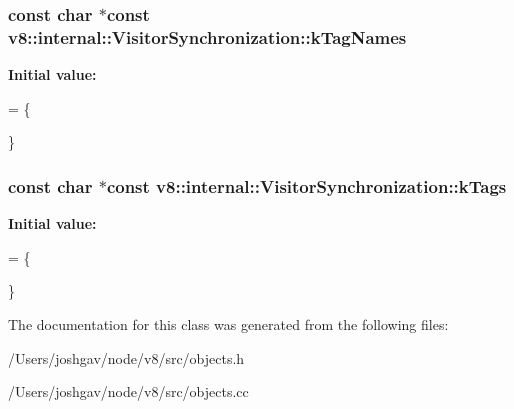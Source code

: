 \subsubsection[{\texorpdfstring{k\+Tag\+Names}{kTagNames}}]{\setlength{\rightskip}{0pt plus 5cm}const char $\ast$const v8\+::internal\+::\+Visitor\+Synchronization\+::k\+Tag\+Names\hspace{0.3cm}{\ttfamily [static]}}\hypertarget{classv8_1_1internal_1_1_visitor_synchronization_a3869a214fa04d932977fabc5391add87}{}\label{classv8_1_1internal_1_1_visitor_synchronization_a3869a214fa04d932977fabc5391add87}
{\bfseries Initial value\+:}
\begin{DoxyCode}
= \{

\}
\end{DoxyCode}
\subsubsection[{\texorpdfstring{k\+Tags}{kTags}}]{\setlength{\rightskip}{0pt plus 5cm}const char $\ast$const v8\+::internal\+::\+Visitor\+Synchronization\+::k\+Tags\hspace{0.3cm}{\ttfamily [static]}}\hypertarget{classv8_1_1internal_1_1_visitor_synchronization_a4ceb9fa65252b22e09054e592e5136c5}{}\label{classv8_1_1internal_1_1_visitor_synchronization_a4ceb9fa65252b22e09054e592e5136c5}
{\bfseries Initial value\+:}
\begin{DoxyCode}
= \{

\}
\end{DoxyCode}


The documentation for this class was generated from the following files\+:\begin{DoxyCompactItemize}
\item 
/\+Users/joshgav/node/v8/src/objects.\+h\item 
/\+Users/joshgav/node/v8/src/objects.\+cc\end{DoxyCompactItemize}
